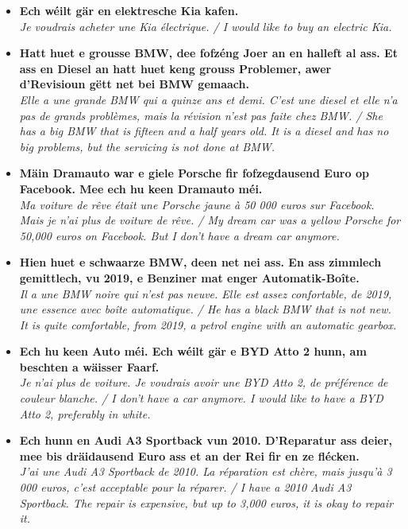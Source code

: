\begin{itemize}
    \item \textbf{Ech wéilt gär en elektresche Kia kafen.} \\
    \textit{Je voudrais acheter une Kia électrique. / I would like to buy an electric Kia.}
    
    \item \textbf{Hatt huet e grousse BMW, dee fofzéng Joer an en halleft al ass. Et ass en Diesel an hatt huet keng grouss Problemer, awer d'Revisioun gëtt net bei BMW gemaach.} \\
    \textit{Elle a une grande BMW qui a quinze ans et demi. C'est une diesel et elle n'a pas de grands problèmes, mais la révision n'est pas faite chez BMW. / She has a big BMW that is fifteen and a half years old. It is a diesel and has no big problems, but the servicing is not done at BMW.}
    
    \item \textbf{Mäin Dramauto war e giele Porsche fir fofzegdausend Euro op Facebook. Mee ech hu keen Dramauto méi.} \\
    \textit{Ma voiture de rêve était une Porsche jaune à 50 000 euros sur Facebook. Mais je n'ai plus de voiture de rêve. / My dream car was a yellow Porsche for 50,000 euros on Facebook. But I don't have a dream car anymore.}
    
    \item \textbf{Hien huet e schwaarze BMW, deen net nei ass. En ass zimmlech gemittlech, vu 2019, e Benziner mat enger Automatik-Boîte.} \\
    \textit{Il a une BMW noire qui n'est pas neuve. Elle est assez confortable, de 2019, une essence avec boîte automatique. / He has a black BMW that is not new. It is quite comfortable, from 2019, a petrol engine with an automatic gearbox.}
    
    \item \textbf{Ech hu keen Auto méi. Ech wéilt gär e BYD Atto 2 hunn, am beschten a wäisser Faarf.} \\
    \textit{Je n'ai plus de voiture. Je voudrais avoir une BYD Atto 2, de préférence de couleur blanche. / I don't have a car anymore. I would like to have a BYD Atto 2, preferably in white.}
    
    \item \textbf{Ech hunn en Audi A3 Sportback vun 2010. D'Reparatur ass deier, mee bis dräidausend Euro ass et an der Rei fir en ze flécken.} \\
    \textit{J'ai une Audi A3 Sportback de 2010. La réparation est chère, mais jusqu'à 3 000 euros, c'est acceptable pour la réparer. / I have a 2010 Audi A3 Sportback. The repair is expensive, but up to 3,000 euros, it is okay to repair it.}
    

\end{itemize}
